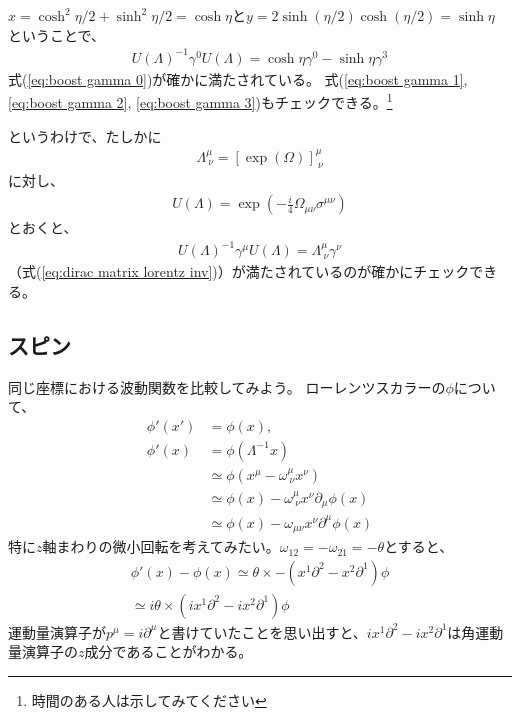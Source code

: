 \documentclass[10pt,a4paper]{jarticle}
\begin{document}
$x = \cosh^2\eta / 2 + \sinh^2 \eta/2 = \cosh\eta$と$y = 2\sinh(\eta/2)\cosh(\eta/2) = \sinh\eta$
ということで、
\begin{align}
U(\Lambda)^{-1} \gamma^0 U(\Lambda) = \cosh\eta \gamma^0 - \sinh\eta \gamma^3
\end{align}
式(\ref{eq:boost gamma 0})が確かに満たされている。
式(\ref{eq:boost gamma 1}, \ref{eq:boost gamma 2}, \ref{eq:boost gamma 3})もチェックできる。\footnote{時間のある人は示してみてください}

というわけで、たしかに
\begin{align}
\Lambda^\mu_{~\nu} = [\exp(\Omega)]^\mu_{~\nu}
\end{align}
に対し、
\begin{align}
U(\Lambda) = \exp\left( -\frac{i}{4} \Omega_{\mu\nu} \sigma^{\mu\nu} \right)
\end{align}
とおくと、
\begin{align}
U(\Lambda)^{-1} \gamma^\mu U(\Lambda) = \Lambda^\mu_{~\nu} \gamma^\nu
\end{align}
（式(\ref{eq:dirac matrix lorentz inv})）が満たされているのが確かにチェックできる。


\subsection{スピン}\label{sec:spin}
同じ座標における波動関数を比較してみよう。
ローレンツスカラーの$\phi$について、
\begin{align}
\phi'(x') &= \phi(x),\\
\phi'(x) &= \phi(\Lambda^{-1} x) \nonumber\\
& \simeq \phi(x^\mu - \omega^{\mu}_{~\nu} x^\nu) \nonumber\\
& \simeq \phi(x) - \omega^{\mu}_{~\nu} x^\nu \partial_\mu \phi(x)  \nonumber\\
& \simeq \phi(x) - \omega_{\mu\nu} x^\nu \partial^\mu \phi(x)
\end{align}
%
特に$z$軸まわりの微小回転を考えてみたい。$\omega_{12} = -\omega_{21} = -\theta$とすると、
\begin{align}
\phi'(x) - \phi(x)
\simeq \theta \times -(x^1 \partial^2 - x^2 \partial^1) \phi \nonumber\\
\simeq i\theta \times ( ix^1 \partial^2 - ix^2 \partial^1) \phi
\end{align}
運動量演算子が$p^\mu = i \partial^\mu$と書けていたことを思い出すと、$ix^1 \partial^2 - ix^2 \partial^1$は角運動量演算子の$z$成分であることがわかる。
\end{document}
